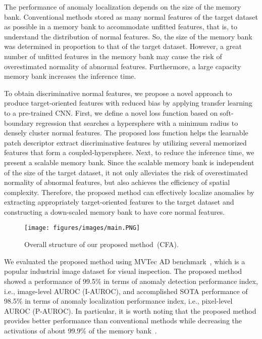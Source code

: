 \documentclass[10pt,twocolumn,letterpaper]{article}
\begin{document}
    The performance of anomaly localization depends on the size of the memory bank. Conventional methods stored as many normal features of the target dataset as possible in a memory bank to accommodate unfitted features, that is, to understand the distribution of normal features. So, the size of the memory bank was determined in proportion to that of the target dataset. However, a great number of unfitted features in the memory bank may cause the risk of overestimated normality of abnormal features. Furthermore, a large capacity memory bank increases the inference time.
    
    To obtain discriminative normal features, we propose a novel approach to produce target-oriented features with reduced bias by applying transfer learning to a pre-trained CNN. First, we define a novel loss function based on soft-boundary regression that searches a hypersphere with a minimum radius to densely cluster normal features. The proposed loss function helps the learnable patch descriptor extract discriminative features by utilizing several memorized features that form a coupled-hypersphere. Next, to reduce the inference time, we present a scalable memory bank. Since the scalable memory bank is independent of the size of the target dataset, it not only alleviates the risk of overestimated normality of abnormal features, but also achieves the efficiency of spatial complexity. Therefore, the proposed method can effectively localize anomalies by extracting appropriately target-oriented features to the target dataset and constructing a down-scaled memory bank to have core normal features.
    \begin{figure*}[t!] 
\begin{center}
    \texttt{[image: figures/images/main.PNG]}
\end{center}
\caption{Overall structure of our proposed method~(CFA).}\vspace{-0.15cm}
\label{fig:main}
\end{figure*}

%
  
    We evaluated the proposed method using MVTec AD benchmark~\cite{mvtec}, which is a popular industrial image dataset for visual inspection. The proposed method showed a performance of 99.5\% in terms of anomaly detection performance index, i.e., image-level AUROC (I-AUROC), and accomplished SOTA performance of 98.5\% in terms of anomaly localization performance index, i.e., pixel-level AUROC (P-AUROC). In particular, it is worth noting that the proposed method provides better performance than conventional methods while decreasing the activations of about 99.9\% of the memory bank~\cite{activations}.
    
\end{document}
